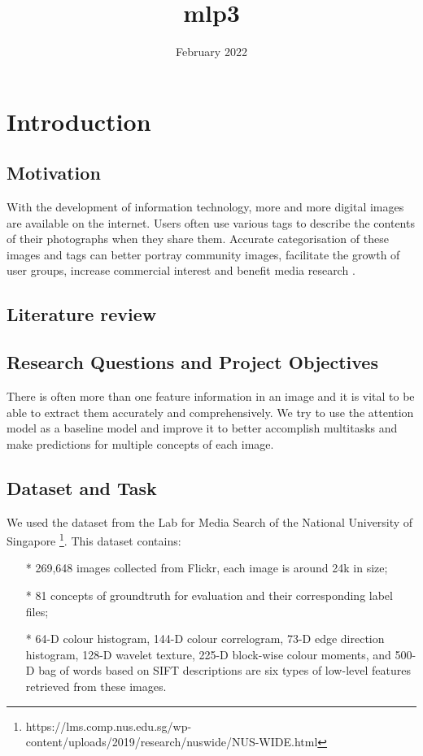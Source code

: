\documentclass{article}
\title{mlp3}
\author{ }
\date{February 2022}
\begin{document}
\maketitle

\section{Introduction}
\subsection{Motivation}
With the development of information technology, more and more digital images are available on the internet. Users often use various tags to describe the contents of their photographs when they share them. Accurate categorisation of these images and tags can better portray community images, facilitate the growth of user groups, increase commercial interest and benefit media research \cite{chua2009nus}.

\subsection{Literature review}


\subsection{Research Questions and Project Objectives}
There is often more than one feature information in an image and it is vital to be able to extract them accurately and comprehensively. We try to use the attention model as a baseline model and improve it to better accomplish multitasks and make predictions for multiple concepts of each image.
 
\subsection{Dataset and Task}
We used the dataset from the Lab for Media Search of the National University of Singapore \footnote{https://lms.comp.nus.edu.sg/wp-content/uploads/2019/research/nuswide/NUS-WIDE.html}. This dataset contains:
\begin{itemize}
\item[*] 269,648 images collected from Flickr, each image is around 24k in size;
\item[*] 81 concepts of groundtruth for evaluation and their corresponding label files;
\item[*] 64-D colour histogram, 144-D colour correlogram, 73-D edge direction histogram, 128-D wavelet texture, 225-D block-wise colour moments, and 500-D bag of words based on SIFT descriptions are six types of low-level features retrieved from these images.
\end{itemize}
\end{document}
